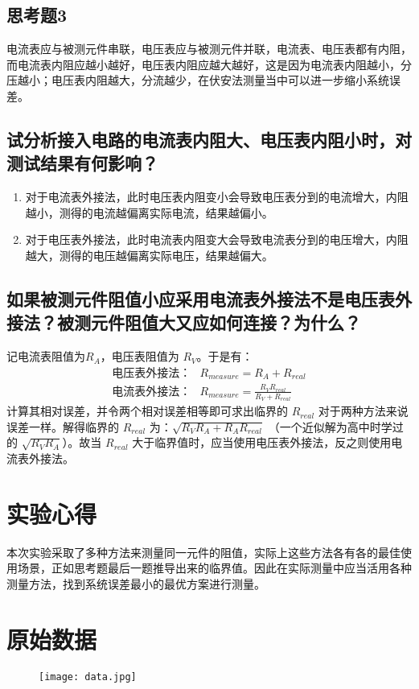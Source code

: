\documentclass[a4paper,utf8]{article}
\begin{document}
    \subsection{思考题3}
        电流表应与被测元件串联，电压表应与被测元件并联，电流表、电压表都有内阻，而电流表内阻应越小越好，电压表内阻应越大越好，这是因为电流表内阻越小，分压越小；电压表内阻越大，分流越少，在伏安法测量当中可以进一步缩小系统误差。
    \subsection{试分析接入电路的电流表内阻大、电压表内阻小时，对测试结果有何影响？}
        \begin{enumerate}
            \item 对于电流表外接法，此时电压表内阻变小会导致电压表分到的电流增大，内阻越小，测得的电流越偏离实际电流，结果越偏小。
            \item 对于电压表外接法，此时电流表内阻变大会导致电流表分到的电压增大，内阻越大，测得的电压越偏离实际电压，结果越偏大。
        \end{enumerate}
    \subsection{如果被测元件阻值小应采用电流表外接法不是电压表外接法？被测元件阻值大又应如何连接？为什么？}
        记电流表阻值为$R_A$，电压表阻值为 $R_V$。于是有：
        \begin{align*}
            \text{电压表外接法：}&R_{measure}=R_A+R_{real}\\
            \text{电流表外接法：}&R_{measure}=\frac{R_V R_{real}}{R_V+R_{real}}
        \end{align*}
        计算其相对误差，并令两个相对误差相等即可求出临界的 $R_{real}$ 对于两种方法来说误差一样。解得临界的 $R_{real}$ 为：$\sqrt{R_V R_{A}+R_A R_{real}}$ （一个近似解为高中时学过的 $\sqrt{R_V R_{A}}$）。故当 $R_{real}$ 大于临界值时，应当使用电压表外接法，反之则使用电流表外接法。
   
\section{实验心得}
    本次实验采取了多种方法来测量同一元件的阻值，实际上这些方法各有各的最佳使用场景，正如思考题最后一题推导出来的临界值。因此在实际测量中应当活用各种测量方法，找到系统误差最小的最优方案进行测量。
\newpage
\section{原始数据}
    \begin{figure}[!ht]
        \texttt{[image: data.jpg]}
    \end{figure}
\end{document}
